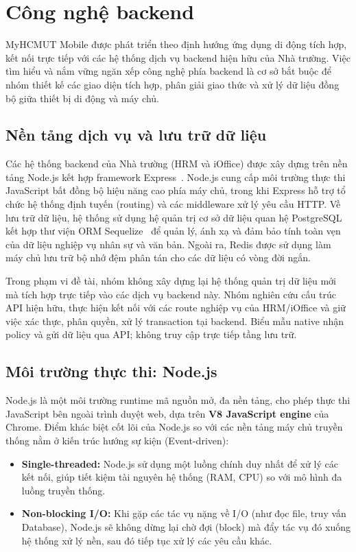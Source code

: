 \section{Công nghệ backend}
\label{sec:congnghe_backend_tichhop}

MyHCMUT Mobile được phát triển theo định hướng ứng dụng di động tích hợp, kết nối trực tiếp với các hệ thống dịch vụ backend hiện hữu của Nhà trường. Việc tìm hiểu và nắm vững ngăn xếp công nghệ phía backend là cơ sở bắt buộc để nhóm thiết kế các giao diện tích hợp, phân giải giao thức và xử lý dữ liệu đồng bộ giữa thiết bị di động và máy chủ.

\subsection{Nền tảng dịch vụ và lưu trữ dữ liệu}
\label{subsec:backend_dulieu}

Các hệ thống backend của Nhà trường (HRM và iOffice) được xây dựng trên nền tảng Node.js kết hợp framework Express~\cite{nodejs_doc, express_doc}. Node.js cung cấp môi trường thực thi JavaScript bất đồng bộ hiệu năng cao phía máy chủ, trong khi Express hỗ trợ tổ chức hệ thống định tuyến (routing) và các middleware xử lý yêu cầu HTTP. Về lưu trữ dữ liệu, hệ thống sử dụng hệ quản trị cơ sở dữ liệu quan hệ PostgreSQL~\cite{postgresql_doc} kết hợp thư viện ORM Sequelize~\cite{sequelize_doc} để quản lý, ánh xạ và đảm bảo tính toàn vẹn của dữ liệu nghiệp vụ nhân sự và văn bản. Ngoài ra, Redis được sử dụng làm máy chủ lưu trữ bộ nhớ đệm phân tán cho các dữ liệu có vòng đời ngắn.

Trong phạm vi đề tài, nhóm không xây dựng lại hệ thống quản trị dữ liệu mới mà tích hợp trực tiếp vào các dịch vụ backend này. Nhóm nghiên cứu cấu trúc API hiện hữu, thực hiện kết nối với các route nghiệp vụ của HRM/iOffice và giữ việc xác thực, phân quyền, xử lý transaction tại backend. Biểu mẫu native nhận policy và gửi dữ liệu qua API; không truy cập trực tiếp tầng lưu trữ.

\subsection{Môi trường thực thi: Node.js}
Node.js là một môi trường runtime mã nguồn mở, đa nền tảng, cho phép thực thi JavaScript
bên ngoài trình duyệt web, dựa trên \textbf{V8 JavaScript engine} của Chrome. Điểm khác biệt
cốt lõi của Node.js so với các nền tảng máy chủ truyền thống nằm ở kiến trúc hướng sự kiện
(Event-driven):
\begin{itemize}
    \item \textbf{Single-threaded:} Node.js sử dụng một luồng chính duy nhất để xử lý các kết nối, giúp tiết kiệm tài nguyên hệ thống (RAM, CPU) so với mô hình đa luồng truyền thống.
    \item \textbf{Non-blocking I/O:} Khi gặp các tác vụ nặng về I/O (như đọc file, truy vấn Database), Node.js sẽ không dừng lại chờ đợi (block) mà đẩy tác vụ đó xuống hệ thống xử lý nền, sau đó tiếp tục xử lý các yêu cầu khác.
\end{itemize}

